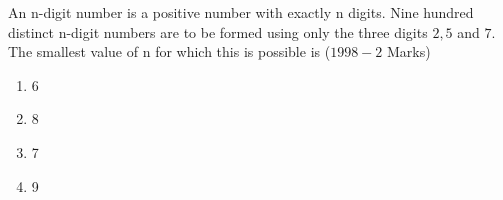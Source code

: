 \iffalse
\title{Assignments}
\author{Mokshith ee24btech11009}
\section{mcq-multiple}
\fi
\item An n-digit number is a positive number with exactly n digits. Nine hundred distinct n-digit numbers are to be formed using only the three digits $2,5$ and $7$. The smallest value of n for which  this is possible is
\hfill{($1998-2$ Marks)}\\
\begin{multicols}{2} 
\begin{enumerate}
\item 6\item 8\columnbreak\item 7\item 9\\
\end{enumerate}
\end{multicols}
